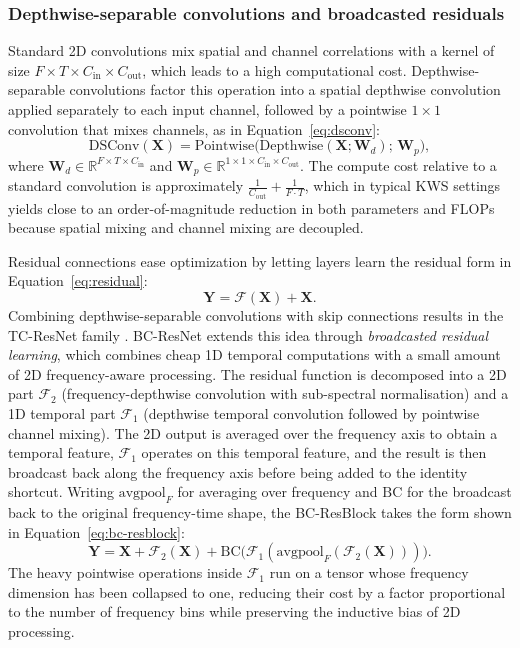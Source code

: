 \documentclass[11pt]{article}
\begin{document}
\subsubsection{Depthwise-separable convolutions and broadcasted residuals}
Standard 2D convolutions mix spatial and channel correlations with a kernel of size $F \times T \times C_{\text{in}} \times C_{\text{out}}$, which leads to a high computational cost. 
Depthwise-separable convolutions \cite{dsconv} factor this operation into a spatial depthwise convolution applied separately to each input channel, followed by a pointwise $1 \times 1$ convolution that mixes channels, as in Equation~\eqref{eq:dsconv}:
\begin{equation}
    \label{eq:dsconv}
    \text{DSConv}(\mathbf{X}) = \text{Pointwise}\bigl(\text{Depthwise}(\mathbf{X}; \mathbf{W}_d);\, \mathbf{W}_p\bigr),
\end{equation}
where $\mathbf{W}_d \in \mathbb{R}^{F \times T \times C_{\text{in}}}$ and $\mathbf{W}_p \in \mathbb{R}^{1 \times 1 \times C_{\text{in}} \times C_{\text{out}}}$. 
The compute cost relative to a standard convolution is approximately $\tfrac{1}{C_{\text{out}}} + \tfrac{1}{F\cdot T}$, which in typical KWS settings yields close to an order-of-magnitude reduction in both parameters and FLOPs because spatial mixing and channel mixing are decoupled.

Residual connections \cite{resnet} ease optimization by letting layers learn the residual form in Equation~\eqref{eq:residual}:
\begin{equation}
    \label{eq:residual}
    \mathbf{Y} = \mathcal{F}(\mathbf{X}) + \mathbf{X}.
\end{equation}
Combining depthwise-separable convolutions with skip connections results in the TC-ResNet family \cite{tcresnet}.
BC-ResNet \cite{bcresnet} extends this idea through \emph{broadcasted residual learning}, which combines cheap 1D temporal computations with a small amount of 2D frequency-aware processing.
The residual function is decomposed into a 2D part $\mathcal{F}_2$ (frequency-depthwise convolution with sub-spectral normalisation) and a 1D temporal part $\mathcal{F}_1$ (depthwise temporal convolution followed by pointwise channel mixing).
The 2D output is averaged over the frequency axis to obtain a temporal feature, $\mathcal{F}_1$ operates on this temporal feature, and the result is then broadcast back along the frequency axis before being added to the identity shortcut.
Writing $\mathrm{avgpool}_F$ for averaging over frequency and $\mathrm{BC}$ for the broadcast back to the original frequency-time shape, the BC-ResBlock takes the form shown in Equation~\eqref{eq:bc-resblock}:
\begin{equation}
    \label{eq:bc-resblock}
    \mathbf{Y} = \mathbf{X} + \mathcal{F}_2(\mathbf{X}) + \mathrm{BC}\bigl(\mathcal{F}_1(\mathrm{avgpool}_F(\mathcal{F}_2(\mathbf{X})))\bigr).
\end{equation}
The heavy pointwise operations inside $\mathcal{F}_1$ run on a tensor whose frequency dimension has been collapsed to one, reducing their cost by a factor proportional to the number of frequency bins while preserving the inductive bias of 2D processing.
\end{document}
